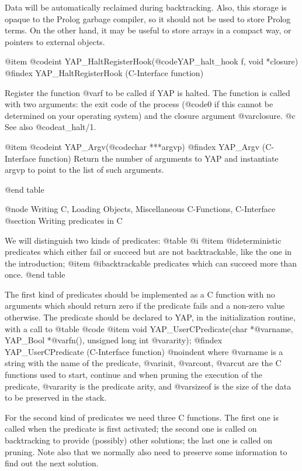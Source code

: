 Data will be automatically reclaimed during
backtracking. Also, this storage is opaque to the Prolog garbage compiler,
so it should not be used to store Prolog terms. On the other hand, it
may be useful to store arrays in a compact way, or pointers to external objects.

@item  @code{int} YAP_HaltRegisterHook(@code{YAP_halt_hook f, void *closure})
@findex YAP_HaltRegisterHook (C-Interface function)

Register the function @var{f} to be called if YAP is halted. The
function is called with two arguments: the exit code of the process
(@code{0} if this cannot be determined on your operating system) and
the closure argument @var{closure}.
@c See also @code{at_halt/1}.

@item  @code{int} YAP_Argv(@code{char ***argvp})
@findex YAP_Argv (C-Interface function)
Return the number of arguments to YAP and instantiate argvp to point to the list of such arguments.

@end table


@node Writing C, Loading Objects, Miscellaneous C-Functions, C-Interface
@section Writing predicates in C

We will distinguish two kinds of predicates:
@table @i
@item @i{deterministic} predicates which either fail or succeed but are not
backtrackable, like the one in the introduction;
@item @i{backtrackable}
predicates which can succeed more than once.
@end table

The first kind of predicates should be implemented as a C function with
no arguments which should return zero if the predicate fails and a
non-zero value otherwise. The predicate should be declared to
YAP, in the initialization routine, with a call to
@table @code
 @item     void YAP_UserCPredicate(char *@var{name}, YAP_Bool *@var{fn}(), unsigned long int @var{arity});
@findex YAP_UserCPredicate (C-Interface function)
@noindent
where @var{name} is a string with the name of the predicate, @var{init},
@var{cont}, @var{cut} are the C functions used to start, continue and
when pruning the execution of the predicate, @var{arity} is the
predicate arity, and @var{sizeof} is the size of the data to be
preserved in the stack.

For the second kind of predicates we need three C functions. The first one
 is called when the predicate is first activated; the second one
is called on backtracking to provide (possibly) other solutions; the
 last one is called on pruning. Note
also that we normally also need to preserve some information to find out
the next solution.

